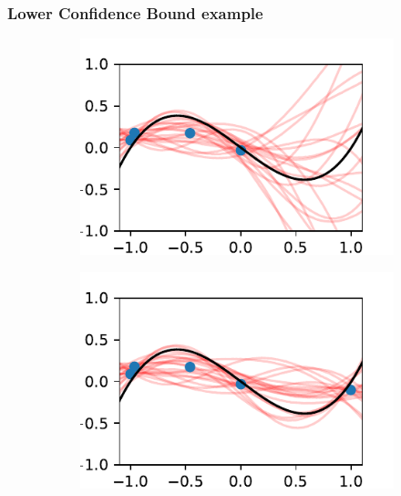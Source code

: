 \documentclass{beamer}
\begin{document}
\begin{frame}
    \frametitle{Lower Confidence Bound example}
    \begin{figure}
        \centering
        \begin{subfigure}[t]{0.4\textwidth}
            \centering
            \includegraphics[width=\textwidth]{UCB_4_iters.pdf}
        \end{subfigure}%
        \begin{subfigure}[t]{0.4\textwidth}
            \centering
            \includegraphics[width=\textwidth]{UCB_5_iters.pdf}
        \end{subfigure}
        \begin{subfigure}[t]{0.4\textwidth}
            \centering

\end{subfigure}
\end{figure}
\end{frame}
\end{document}
